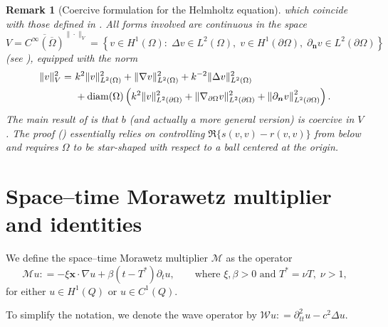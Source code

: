 \documentclass[a4paper]{article}
\theoremstyle{plain}
\newtheorem{remark}[theorem]{Remark}
\theoremstyle{definition}
\newcommand{\operator}[1]{\mathcal{#1}}
\newcommand{\Grad}[1]{\nabla #1}
\newcommand{\Lap}[1]{\Delta #1}
\newcommand{\TimeDer}{{\partial^{}_t}}
\newcommand{\SecondTimeDer}{{\partial^2_{tt}}}
\newcommand{\NormDer}{{\partial_{\bm{n}}}}
\newcommand{\vect}[1]{\bm{#1}}
\begin{document}
\begin{remark}[Coercive formulation for the Helmholtz equation]
	which coincide with those defined in \cite[eq.~(1.23), (1.24)]{Moiola2014}.
	All forms involved are continuous in the space
	\begin{equation*}
		V = \overline{C^{\infty}(\overline{\Omega})}^{\| \cdot \|_V}
		=\left\{v\in H^1(\Omega) : \;\Lap v \in L^2(\Omega),\; v \in H^1(\partial \Omega),\;
		\NormDer{v} \in L^2(\partial \Omega) \right\}
	\end{equation*}
	(see \cite[eq.~(1.21) and Lemma~A.1]{Moiola2014}),
	equipped with the norm
	\begin{align*}\|v\|^2_V = \  & k^2\|v\|^2_{L^2(\Omega)} + \|\Grad v\|^2_{L^2(\Omega)} + k^{-2}\|\Lap v\|^2_{L^2(\Omega)} \\&
		+ \mathrm{diam}(\Omega) \left(k^2\|v\|^2_{L^2(\partial \Omega)} + \|\Grad_{\partial \Omega} v\|^2_{L^2(\partial \Omega)} + \left\|\NormDer{v}\right\|^2_{L^2(\partial \Omega)} \right).
	\end{align*}
	The main result of \cite{Moiola2014} is that $b$ (and actually a more general version) is coercive in $V$.
	The proof (\cite[Thm.~3.4]{Moiola2014}) essentially relies on controlling $\Re\{s(v,v)-r(v,v)\}$ from below and requires $\Omega$ to be star-shaped with respect to a ball centered at the origin.
\end{remark}


\section{Space--time Morawetz multiplier and identities}
\label{sec:Identities}

We define the space--time Morawetz multiplier $\operator{M}$ as the operator
\begin{equation}\label{eq:multiplier_def}
\operator{M} u : = - \xi \vect{x} \cdot \Grad u + \beta (t - T^*)\TimeDer{u},
\qquad\text{where } \xi, \beta > 0 \text{ and }T^* = \nu T,\; \nu > 1,
\end{equation}
for either $u\in H^1(Q)$ or $u\in C^1(Q)$.

To simplify the notation, we denote the wave operator by $\operator{W}u: = \SecondTimeDer{u} - c^2 \Lap u$.
\end{document}
